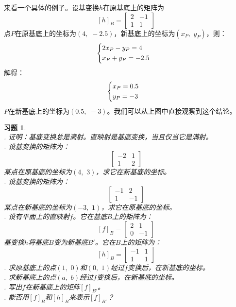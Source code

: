 \documentclass[12pt,UTF8]{ctexbook}
\newtheorem{xt}{习题}[section]
\begin{document}
来看一个具体的例子。设基变换$h$在原基底上的矩阵为
$$
\left[h\right]_{B} = 
\begin{bmatrix}
    2 & -1 \\ 1 & 1
\end{bmatrix}
$$
点$P$在原基底上的坐标为$(4,\,\, -2.5)$，新基底上的坐标为$(x_P,\,\, y_P)$，则：
\begin{alignat*}{1}
    &   \begin{dcases}
            2x_P  - y_P = 4 \\
            x_P + y_P = -2.5
        \end{dcases}
\end{alignat*}
解得：
\begin{alignat*}{1}
    &   \begin{dcases}
            x_P = 0.5 \\
            y_P = -3
        \end{dcases}
\end{alignat*}
$P$在新基底上的坐标为$(0.5, \,\, -3)$。我们可以从上图中直接观察到这个结论。

\begin{xt}
    \mbox{} \\
    . 证明：基底变换总是满射。直映射是基底变换，当且仅当它是满射。\\
    . 设基变换的矩阵为：
    $$
    \begin{bmatrix}
        -2 & 1 \\ 1 & 2
    \end{bmatrix}
    $$
    \indent 某点在原基底的坐标为$(4,\,\,3)$，求它在新基底的坐标。\\
    . 设基变换的矩阵为：
    $$
    \begin{bmatrix}
        -1 & 2 \\ 1 & -1
    \end{bmatrix}
    $$
    \indent 某点在新基底的坐标为$(-3,\,\,1)$，求它在原基底的坐标。\\
    . 设有平面上的直映射$f$。它在基底$B$上的矩阵为：
    $$
    \left[f\right]_{B} = 
    \begin{bmatrix}
        2 & 1 \\ 0 & -1
    \end{bmatrix}
    $$
    \indent 基变换$h$将基底$B$变为新基底$B'$。它在$B$上的矩阵为：
    $$
    \left[h\right]_{B} = 
    \begin{bmatrix}
        -1 & 1 \\ 1 & 1
    \end{bmatrix}
    $$
    . 求原基底上的点$(1,\,\,0)$和$(0,\,\,1)$经过$f$变换后，在新基底的坐标。\\
    . 求新基底上的点$(a,\,\,b)$经过$f$变换后，在新基底的坐标。\\
    . 写出$f$在新基底上的矩阵$[f]_{B'}$。\\
    . 能否用$[f]_{B}$和$[h]_{B}$来表示$[f]_{B'}$？
\end{xt}
\end{document}
